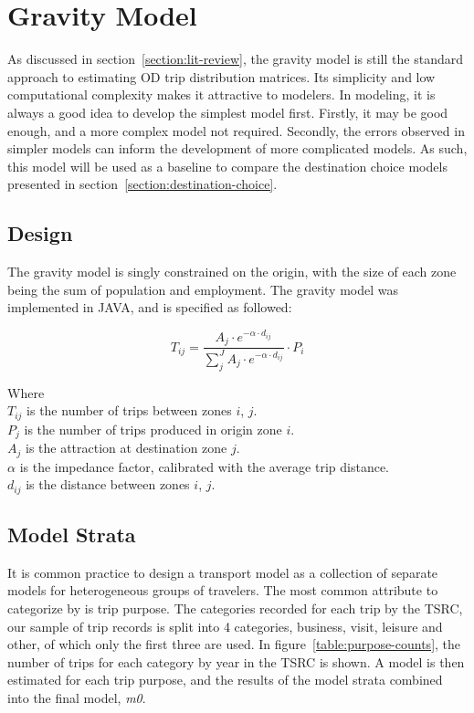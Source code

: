 \chapter{Gravity Model} 
\label{section:gravity-model}
As discussed in section~\ref{section:lit-review}, the gravity model is still the standard approach to estimating OD trip distribution matrices. Its simplicity and low computational complexity makes it attractive to modelers. In modeling, it is always a good idea to develop the simplest model first. Firstly, it may be good enough, and a more complex model not required. Secondly, the errors observed in simpler models can inform the development of more complicated models. As such, this model will be used as a baseline to compare the destination choice models presented in section~\ref{section:destination-choice}.

\section{Design}
The gravity model is singly constrained on the origin, with the size of each zone being the sum of population and employment. The gravity model was implemented in JAVA, and is specified as followed:

$$ 
T_{ij} = \frac{A_j \cdot e^{-\alpha \cdot d_{ij}}}{\sum_j^J A_j \cdot e^{-\alpha \cdot d_{ij}}} \cdot P_i $$

Where \\
$T_{ij}$ is the number of trips between zones $i$, $j$. \\
$P_j$ is the number of trips produced in origin zone $i$.\\
$A_j$ is the attraction at destination zone $j$.\\
$\alpha$ is the impedance factor, calibrated with the average trip distance.\\
$d_{ij}$ is the distance between zones $i$, $j$.\\

\section{Model Strata}
It is common practice to design a transport model as a collection of separate models for heterogeneous groups of travelers. The most common attribute to categorize by is trip purpose. The categories recorded for each trip by the TSRC, our sample of trip records is split into 4 categories, business, visit, leisure and other, of which only the first three are used. In figure~\ref{table:purpose-counts}, the number of trips for each category by year in the TSRC is shown. A model is then estimated for each trip purpose, and the results of the model strata combined into the final model, \textit{m0}. 


